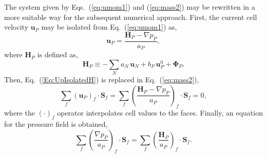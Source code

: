 \documentclass[final,3p,times,11pt,onecolumn]{myElsarticle}
\numberwithin{equation}{section}
\begin{document}
The system given by Eqs.~(\ref{eq:umom1}) and (\ref{eq:mass2}) may be rewritten in a more suitable way for the subsequent numerical approach. First, the current cell velocity $\boldsymbol{u}_{P}$ may be isolated from Eq.~(\ref{eq:umom1}) as,
\begin{equation}
\label{Eq:UpIsolatedH}
\boldsymbol{u}_P
=
\dfrac
{
\boldsymbol{H}_P
- 
\nabla p_P}
{a_P},
\end{equation}
\noindent where $\boldsymbol{H}_P$ is defined as,
\begin{equation}
\boldsymbol{H}_P
\equiv
-\sum_{N} a_{N}\,\boldsymbol{u}_{N}
+
b_P\, \boldsymbol{u}^0_P 
+ 
\boldsymbol{\Phi}_P.
\end{equation}
Then, Eq.~(\ref{Eq:UpIsolatedH}) is replaced in Eq.~(\ref{eq:mass2}),
\begin{equation}
\sum_{f} 
\left(
\boldsymbol{u}_{P} 
\right)_f
\cdotp 
\textbf{S}_{f} 
=
\sum_{f} 
\left(
\dfrac
{
\boldsymbol{H}_P
- 
\nabla p_P}
{a_P}
\right)_f
\cdotp 
\textbf{S}_{f}
= 
0,
\end{equation}
where the $(\cdot)_f$ operator interpolates cell values to the faces. Finally, an equation for the pressure field is obtained,
\begin{equation}
\label{Eq:firstPressureEq}
\sum_{f} 
\left(
\dfrac
{
\nabla p_P}
{a_P}
\right)_f
\cdotp 
\textbf{S}_{f}
=
\sum_{f} 
\left(
\dfrac
{
\boldsymbol{H}_P
}
{a_P}
\right)_f
\cdotp 
\textbf{S}_{f}.
\end{equation}
\end{document}
